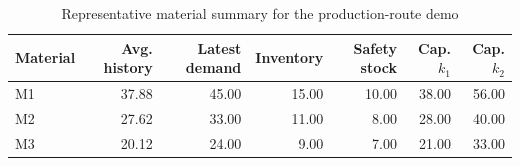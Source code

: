 \begin{table}[H]
\centering
\caption{Representative material summary for the production-route demo}
\label{tab:demo-v1-material-summary}
\begin{tabular}{lrrrrrr}
\toprule
Material & Avg. history & Latest demand & Inventory & Safety stock & Cap. $k_1$ & Cap. $k_2$ \\
\midrule
M1 & 37.88 & 45.00 & 15.00 & 10.00 & 38.00 & 56.00 \\
M2 & 27.62 & 33.00 & 11.00 & 8.00 & 28.00 & 40.00 \\
M3 & 20.12 & 24.00 & 9.00 & 7.00 & 21.00 & 33.00 \\
\bottomrule
\end{tabular}
\end{table}

